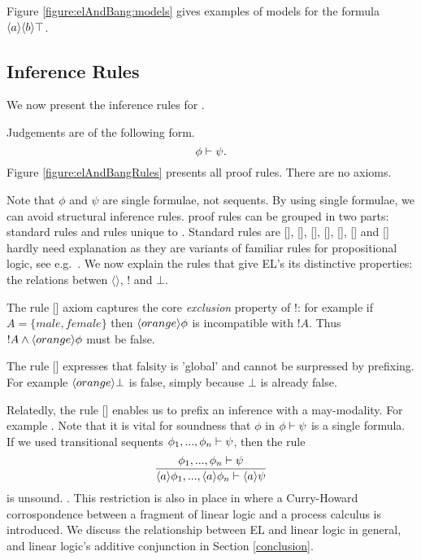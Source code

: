 \NI Figure \ref{figure:elAndBang:models} gives examples of models for
the formula $\langle a \rangle \langle b \rangle \top$. 

\subsection{Inference Rules}



\NI We now present the inference rules for \ELFULL{}. 

\begin{definition} Judgements are of the following form.
\[
  \phi \vdash \psi.
\]
Figure \ref{figure:elAndBangRules} presents all proof rules. There are
no axioms.
\end{definition}

\NI Note that $\phi$ and $\psi$ are single formulae, not sequents.  By
using single formulae, we can avoid structural inference rules.  \ELABR{}
proof rules can be grouped in two parts: standard rules and rules
unique to \ELABR{}.  Standard rules are [],
[], [],
[], [],
[] and [] hardly need
explanation as they are variants of familiar rules for propositional
logic, see e.g.~\cite{TroelstraAS:basprot,vanDalenD:logstr}.  We now
explain the rules that give EL's its distinctive properties: the
relations betwen $\langle \rangle$, $!$ and $\bot$.

The rule [] axiom captures the core
\emph{exclusion} property of !: for example if $A = \{male, female\}$
then $\langle orange \rangle \phi$ is incompatible with $!A$. Thus $!A \land
\langle orange \rangle \phi$ must be false.

The rule [] expresses that falsity is 'global'
  and cannot be surpressed by prefixing. For example
  $\langle orange \rangle \bot$ is false, simply because $\bot$ is already
  false.

Relatedly, the rule [] enables us to
prefix an inference with a may-modality. For example . Note that it is vital for soundness that $\phi$ in $\phi
\vdash \psi$ is a single formula. If we used transitional sequents $\phi_1, ..., \phi_n \vdash \psi$,
then the rule
\[
   \frac{\displaystyle{ 
     \phi_1, ..., \phi_n \vdash\psi
    }}{\displaystyle{ 
     \langle a \rangle \phi_1, ..., \langle a \rangle \phi_n \vdash\langle a \rangle \psi
    }}
\]
is unsound. . This
restriction is also in place in \cite{GaySJ:typcalosp} where a
Curry-Howard corrospondence between a fragment of linear logic
\cite{GirardJY:linlog,GirardJY:protyp} and a process calculus is
introduced. We discuss the relationship between EL and linear logic in
general, and linear logic's additive conjunction in Section
\ref{conclusion}.

